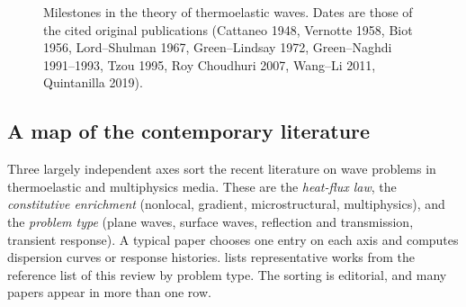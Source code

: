 \begin{figure}[t]\centering
{}
\caption{Milestones in the theory of thermoelastic waves. Dates are those of the cited original publications (Cattaneo 1948, Vernotte 1958, Biot 1956, Lord--Shulman 1967, Green--Lindsay 1972, Green--Naghdi 1991--1993, Tzou 1995, Roy Choudhuri 2007, Wang--Li 2011, Quintanilla 2019).}\label{fig:timeline}
\end{figure}

\subsection{A map of the contemporary literature}
Three largely independent axes sort the recent literature on wave problems in thermoelastic and multiphysics media. These are the \emph{heat-flux law}, the \emph{constitutive enrichment} (nonlocal, gradient, microstructural, multiphysics), and the \emph{problem type} (plane waves, surface waves, reflection and transmission, transient response). A typical paper chooses one entry on each axis and computes dispersion curves or response histories.  lists representative works from the reference list of this review by problem type. The sorting is editorial, and many papers appear in more than one row.

